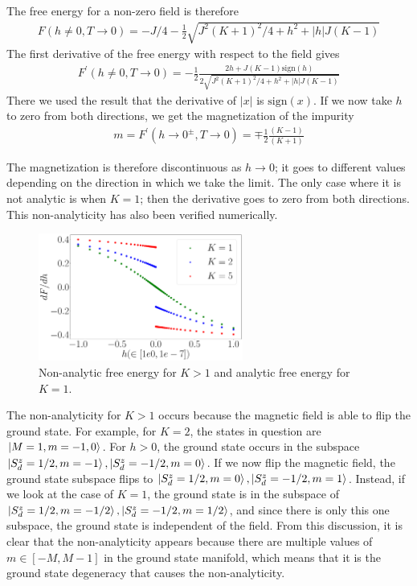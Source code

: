 \documentclass[12pt]{revtex4-2}
\begin{document}
The free energy for a non-zero field is therefore
\begin{equation}\begin{aligned}
	F(h\neq 0, T\to 0) = -J/4 - \frac{1}{2}\sqrt{J^2(K+1)^2/4 + h^2 + |h|J(K-1)}
\end{aligned}\end{equation}
The first derivative of the free energy with respect to the field gives
\begin{equation}\begin{aligned}
	F^\prime(h\neq 0, T\to 0) =- \frac{1}{2}\frac{2h + J(K-1)\text{sign}(h)}{2\sqrt{J^2(K+1)^2/4 + h^2 + |h|J(K-1)}}
\end{aligned}\end{equation}
There we used the result that the derivative of \(|x|\) is \(\text{sign}(x)\). If we now take \(h\) to zero from both directions, we get the magnetization of the impurity
\begin{equation}\begin{aligned}
	m = F^\prime(h \to 0^\pm, T\to 0) = \mp \frac{1}{2}\frac{(K-1)}{(K+1)}
\end{aligned}\end{equation}

The magnetization is therefore discontinuous as \(h\to 0\); it goes to different values depending on the direction in which we take the limit. The only case where it is not analytic is when \(K=1\); then the derivative goes to zero from both directions. This non-analyticity has also been verified numerically.
\begin{figure}[htpb]
	\centering
	\includegraphics[width=0.6\textwidth]{../numerics/disc_mag_imp.pdf}
	\caption{Non-analytic free energy for \(K>1\) and analytic free energy for \(K=1\).}
\end{figure}

The non-analyticity for \(K>1\) occurs because the magnetic field is able to flip the ground state. For example, for \(K=2\), the states in question are \(\ket{M=1, m=-1,0}\). For \(h>0\), the ground state occurs in the subspace \(\ket{S_d^z=1/2, m=-1},\ket{S_d^z=-1/2,m=0}\). If we now flip the magnetic field, the ground state subspace flips to \(\ket{S_d^z=1/2, m=0},\ket{S_d^z=-1/2,m=1}\). Instead, if we look at the case of \(K=1\), the ground state is in the subspace of \(\ket{S_d^z=1/2,m=-1/2},\ket{S_d^z=-1/2, m=1/2}\), and since there is only this one subspace, the ground state is independent of the field. From this discussion, it is clear that the non-analyticity appears because there are multiple values of \(m \in [-M, M-1]\) in the ground state manifold, which means that it is the ground state degeneracy that causes the non-analyticity.
\end{document}
